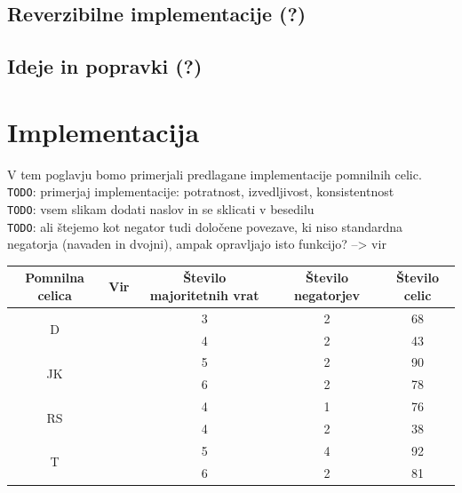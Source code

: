 \documentclass[a4paper, 11pt]{article}
\newcommand{\todo}{\textcolor{BrickRed}{\texttt{TODO}}} %
\begin{document}
\subsection{Reverzibilne implementacije (?)}

\subsection{Ideje in popravki (?)}


\section{Implementacija}
V tem poglavju bomo primerjali predlagane implementacije pomnilnih celic.\\
\todo: primerjaj implementacije: potratnost, izvedljivost, konsistentnost\\
\todo: vsem slikam dodati naslov in se sklicati v besedilu\\
\todo: ali štejemo kot negator tudi določene povezave, ki niso standardna negatorja (navaden in dvojni), ampak opravljajo isto funkcijo? --> vir \cite{quantum_dot}

\begin{tabular}{|c|c|c|c|c|}
\hline 
Pomnilna celica & Vir & Število majoritetnih vrat & Število negatorjev & Število celic \\ 
\hline 
\multirow{2}{*}{D} & \cite{quantum_dot} & 3 & 2 & 68 \\ 
& \cite{a_novel_approach} & 4 & 2 & 43 \\ 
\hline 
\multirow{2}{*}{JK} & \cite{quantum_dot} & 5 & 2 & 90 \\ 
& \cite{a_novel_approach} & 6 & 2 & 78 \\ 
\hline 
\multirow{2}{*}{RS} & \cite{quantum_dot} & 4 & 1 & 76 \\ 
& \cite{a_novel_approach} & 4 & 2 & 38 \\ 
\hline 
\multirow{2}{*}{T} & \cite{quantum_dot} & 5 & 4 & 92 \\  
& \cite{a_novel_approach} & 6 & 2 & 81 \\ 
\hline 
\end{tabular} 
\end{document}
